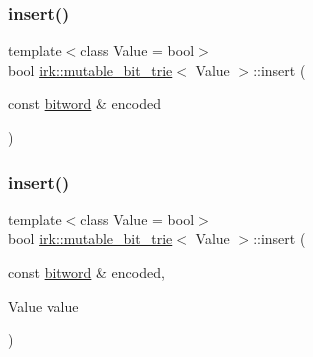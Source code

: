 \mbox{\label{classirk_1_1mutable__bit__trie_adc61a687ca59be58a5538e4e9f5df0cc}} 
\subsubsection{\texorpdfstring{insert()}{insert()}\hspace{0.1cm}{\footnotesize\ttfamily [1/2]}}
{\footnotesize\ttfamily template$<$class Value = bool$>$ \\
bool \mbox{\hyperlink{classirk_1_1mutable__bit__trie}{irk\+::mutable\+\_\+bit\+\_\+trie}}$<$ Value $>$\+::insert (\begin{DoxyParamCaption}\item[{const \mbox{\hyperlink{namespaceirk_a5d1a67079cf6423ecaededebe848f083}{bitword}} \&}]{encoded }\end{DoxyParamCaption})\hspace{0.3cm}{\ttfamily [inline]}}

\mbox{\label{classirk_1_1mutable__bit__trie_a694f1825422ce94a786bc922baef651d}} 
\subsubsection{\texorpdfstring{insert()}{insert()}\hspace{0.1cm}{\footnotesize\ttfamily [2/2]}}
{\footnotesize\ttfamily template$<$class Value = bool$>$ \\
bool \mbox{\hyperlink{classirk_1_1mutable__bit__trie}{irk\+::mutable\+\_\+bit\+\_\+trie}}$<$ Value $>$\+::insert (\begin{DoxyParamCaption}\item[{const \mbox{\hyperlink{namespaceirk_a5d1a67079cf6423ecaededebe848f083}{bitword}} \&}]{encoded,  }\item[{Value}]{value }\end{DoxyParamCaption})\hspace{0.3cm}{\ttfamily [inline]}}

\mbox{\label{classirk_1_1mutable__bit__trie_a82b109eb8816a4ff9093ca5649d13db9}} 
